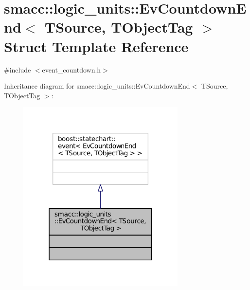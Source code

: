 \hypertarget{structsmacc_1_1logic__units_1_1EvCountdownEnd}{}\section{smacc\+:\+:logic\+\_\+units\+:\+:Ev\+Countdown\+End$<$ T\+Source, T\+Object\+Tag $>$ Struct Template Reference}
\label{structsmacc_1_1logic__units_1_1EvCountdownEnd}


{\ttfamily \#include $<$event\+\_\+countdown.\+h$>$}



Inheritance diagram for smacc\+:\+:logic\+\_\+units\+:\+:Ev\+Countdown\+End$<$ T\+Source, T\+Object\+Tag $>$\+:
\nopagebreak
\begin{figure}[H]
\begin{center}
\leavevmode
\includegraphics[width=238pt]{structsmacc_1_1logic__units_1_1EvCountdownEnd__inherit__graph}
\end{center}
\end{figure}



